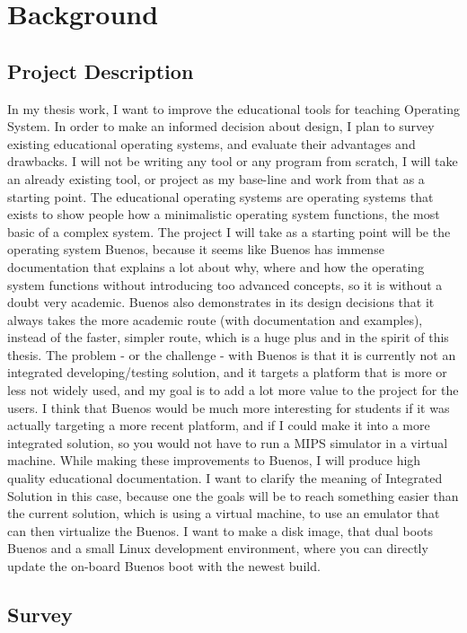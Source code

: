 \chapter{Background}

\section{Project Description}

In my thesis work, I want to improve the educational tools for teaching Operating System. In order to make an informed decision about design, I plan to survey existing educational operating systems, and evaluate their advantages and drawbacks. I will not be writing any tool or any program from scratch, I will take an already existing tool, or project as my base-line and work from that as a starting point.
The educational operating systems are operating systems that exists to show people how a minimalistic operating system functions, the most basic of a complex system.
The project I will take as a starting point will be the operating system Buenos, because it seems like Buenos has immense documentation that explains a lot about why, where and how the operating system functions without introducing too advanced concepts, so it is without a doubt very academic.
Buenos also demonstrates in its design decisions that it always takes the more academic route (with documentation and examples), instead of the faster, simpler route, which is a huge plus and in the spirit of this thesis. The problem - or the challenge - with Buenos is that it is currently not an integrated developing/testing solution, and it targets a platform that is more or less not widely used, and my goal is to add a lot more value to the project for the users. I think that Buenos would be much more interesting for students if it was actually targeting a more recent platform, and if I could make it into a more integrated solution, so you would not have to run a MIPS simulator in a virtual machine. While making these improvements to Buenos, I will produce high quality educational documentation.
I want to clarify the meaning of Integrated Solution in this case, because one the goals will be to reach something easier than the current solution, which is using a virtual machine, to use an emulator that can then virtualize the Buenos. I want to make a disk image, that dual boots Buenos and a small Linux development environment, where you can directly update the on-board Buenos boot with the newest build.

\pagebreak
\section{Survey}

